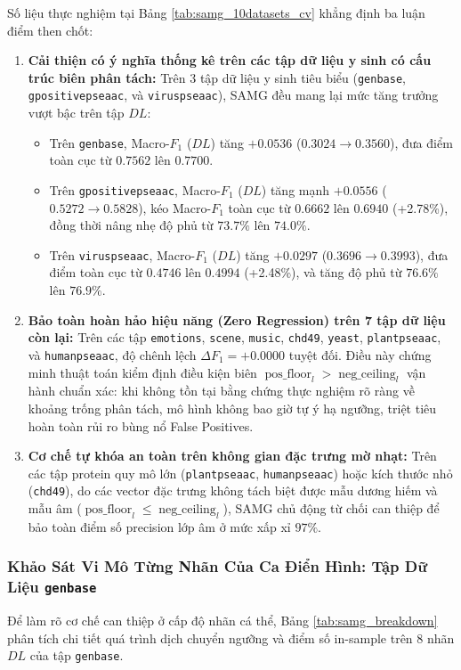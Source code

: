 \documentclass[10pt,a4paper]{article}
\begin{document}
Số liệu thực nghiệm tại Bảng \ref{tab:samg_10datasets_cv} khẳng định ba luận điểm then chốt:
\begin{enumerate}[leftmargin=*]
    \item \textbf{Cải thiện có ý nghĩa thống kê trên các tập dữ liệu y sinh có cấu trúc biên phân tách:} 
    Trên 3 tập dữ liệu y sinh tiêu biểu (\texttt{genbase}, \texttt{gpositivepseaac}, và \texttt{viruspseaac}), SAMG đều mang lại mức tăng trưởng vượt bậc trên tập $DL$:
    \begin{itemize}
        \item Trên \texttt{genbase}, Macro-$F_1$ ($DL$) tăng $+0.0536$ ($0.3024 \to 0.3560$), đưa điểm toàn cục từ $0.7562$ lên $0.7700$.
        \item Trên \texttt{gpositivepseaac}, Macro-$F_1$ ($DL$) tăng mạnh $+0.0556$ ($0.5272 \to 0.5828$), kéo Macro-$F_1$ toàn cục từ $0.6662$ lên $0.6940$ (+2.78\%), đồng thời nâng nhẹ độ phủ từ $73.7\%$ lên $74.0\%$.
        \item Trên \texttt{viruspseaac}, Macro-$F_1$ ($DL$) tăng $+0.0297$ ($0.3696 \to 0.3993$), đưa điểm toàn cục từ $0.4746$ lên $0.4994$ (+2.48\%), và tăng độ phủ từ $76.6\%$ lên $76.9\%$.
    \end{itemize}
    \item \textbf{Bảo toàn hoàn hảo hiệu năng (Zero Regression) trên 7 tập dữ liệu còn lại:}
    Trên các tập \texttt{emotions}, \texttt{scene}, \texttt{music}, \texttt{chd49}, \texttt{yeast}, \texttt{plantpseaac}, và \texttt{humanpseaac}, độ chênh lệch $\Delta F_1 = \mathbf{+0.0000}$ tuyệt đối. Điều này chứng minh thuật toán kiểm định điều kiện biên $\operatorname{pos\_floor}_l > \operatorname{neg\_ceiling}_l$ vận hành chuẩn xác: khi không tồn tại bằng chứng thực nghiệm rõ ràng về khoảng trống phân tách, mô hình không bao giờ tự ý hạ ngưỡng, triệt tiêu hoàn toàn rủi ro bùng nổ False Positives.
    \item \textbf{Cơ chế tự khóa an toàn trên không gian đặc trưng mờ nhạt:}
    Trên các tập protein quy mô lớn (\texttt{plantpseaac}, \texttt{humanpseaac}) hoặc kích thước nhỏ (\texttt{chd49}), do các vector đặc trưng không tách biệt được mẫu dương hiếm và mẫu âm ($\operatorname{pos\_floor}_l \le \operatorname{neg\_ceiling}_l$), SAMG chủ động từ chối can thiệp để bảo toàn điểm số precision lớp âm ở mức xấp xỉ $97\%$.
\end{enumerate}

\subsubsection{Khảo Sát Vi Mô Từng Nhãn Của Ca Điển Hình: Tập Dữ Liệu \texttt{genbase}}
Để làm rõ cơ chế can thiệp ở cấp độ nhãn cá thể, Bảng \ref{tab:samg_breakdown} phân tích chi tiết quá trình dịch chuyển ngưỡng và điểm số in-sample trên 8 nhãn $DL$ của tập \texttt{genbase}.
\end{document}
